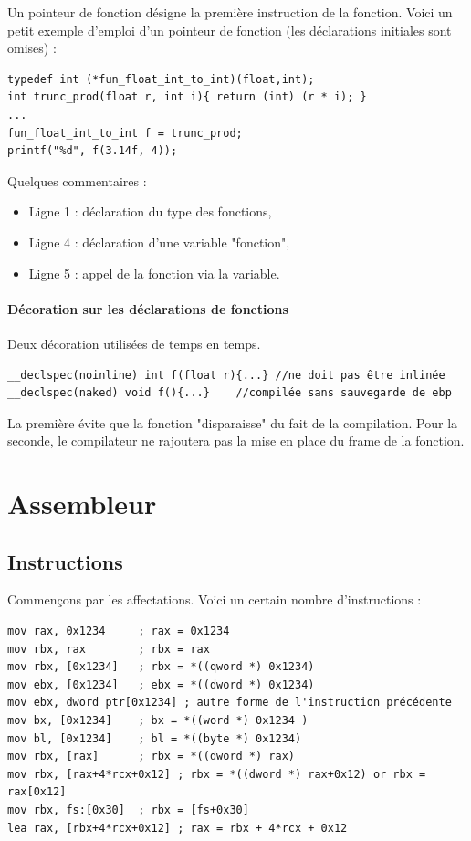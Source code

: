 \documentclass{book}
\begin{document}
Un pointeur de fonction désigne la première instruction de la fonction. Voici un petit exemple d'emploi d'un pointeur de fonction (les déclarations initiales sont omises) : 

\begin{verbatim}
typedef int (*fun_float_int_to_int)(float,int);
int trunc_prod(float r, int i){ return (int) (r * i); }
...
fun_float_int_to_int f = trunc_prod;
printf("%d", f(3.14f, 4));
\end{verbatim}

Quelques commentaires : 

\begin{itemize}
	\item Ligne 1 : déclaration du type des fonctions, 
	\item Ligne 4 : déclaration d'une variable "fonction",
	\item Ligne 5 : appel de la fonction via la variable. 
\end{itemize}

\paragraph{Décoration sur les déclarations de fonctions }

Deux décoration utilisées de temps en temps. 

\begin{verbatim}
__declspec(noinline) int f(float r){...} //ne doit pas être inlinée
__declspec(naked) void f(){...}    //compilée sans sauvegarde de ebp
\end{verbatim}

La première évite que la fonction "disparaisse" du fait de la compilation. Pour la seconde, le compilateur ne rajoutera pas la mise en place du frame de la fonction. 



\section{Assembleur}

\subsection{Instructions}
Commençons par les affectations. Voici un certain nombre d'instructions :  
\begin{verbatim}
mov rax, 0x1234     ; rax = 0x1234
mov rbx, rax        ; rbx = rax
mov rbx, [0x1234]   ; rbx = *((qword *) 0x1234)
mov ebx, [0x1234]   ; ebx = *((dword *) 0x1234) 
mov ebx, dword ptr[0x1234] ; autre forme de l'instruction précédente
mov bx, [0x1234]    ; bx = *((word *) 0x1234 )
mov bl, [0x1234]    ; bl = *((byte *) 0x1234)
mov rbx, [rax]      ; rbx = *((dword *) rax)
mov rbx, [rax+4*rcx+0x12] ; rbx = *((dword *) rax+0x12) or rbx = rax[0x12]
mov rbx, fs:[0x30]  ; rbx = [fs+0x30]
lea rax, [rbx+4*rcx+0x12] ; rax = rbx + 4*rcx + 0x12
\end{verbatim}
\end{document}
